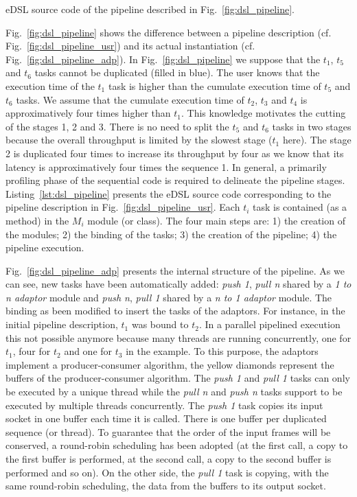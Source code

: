 \begin{listing}[htp]
  \inputminted[frame=lines,linenos]{C++}{main/chapter6/src/pipeline/pipeline.cpp}
  \caption{\AFFECT \Cxx eDSL source code of the pipeline described in
    Fig.~\ref{fig:dsl_pipeline}.}
  \label{lst:dsl_pipeline}
\end{listing}

Fig.~\ref{fig:dsl_pipeline} shows the difference between a pipeline description
(cf. Fig.~\ref{fig:dsl_pipeline_usr}) and its actual instantiation (cf.
Fig.~\ref{fig:dsl_pipeline_adp}). In Fig.~\ref{fig:dsl_pipeline} we suppose
that the $t_1$, $t_5$ and $t_6$ tasks cannot be duplicated (filled in blue). The
user knows that the execution time of the $t_1$ task is higher than the cumulate
execution time of $t_5$ and $t_6$ tasks. We assume that the cumulate execution
time of $t_2$, $t_3$ and $t_4$ is approximatively four times higher than $t_1$.
This knowledge motivates the cutting of the stages 1, 2 and 3. There is no need
to split the $t_5$ and $t_6$ tasks in two stages because the overall throughput
is limited by the slowest stage ($t_1$ here). The stage 2 is duplicated four
times to increase its throughput by four as we know that its latency is
approximatively four times the sequence 1. In general, a primarily profiling
phase of the sequential code is required to delineate the pipeline stages.
Listing~\ref{lst:dsl_pipeline} presents the \Cxx eDSL source code corresponding
to the pipeline description in Fig.~\ref{fig:dsl_pipeline_usr}. Each $t_i$ task
is contained (as a method) in the $M_i$ module (or class). The four main steps
are: 1) the creation of the modules; 2) the binding of the tasks; 3) the
creation of the pipeline; 4) the pipeline execution.

Fig.~\ref{fig:dsl_pipeline_adp} presents the internal structure of the pipeline.
As we can see, new tasks have been automatically added: \emph{push 1},
\emph{pull n} shared by a \emph{1 to n adaptor} module and \emph{push n},
\emph{pull 1} shared by a \emph{n to 1 adaptor} module. The binding as been
modified to insert the tasks of the adaptors. For instance, in the initial
pipeline description, $t_1$ was bound to $t_2$. In a parallel pipelined
execution this not possible anymore because many threads are running
concurrently, one for $t_1$, four for $t_2$ and one for $t_3$ in the example. To
this purpose, the adaptors implement a producer-consumer algorithm, the yellow
diamonds represent the buffers of the producer-consumer algorithm. The
\emph{push 1} and \emph{pull 1} tasks can only be executed by a unique thread
while the \emph{pull n} and \emph{push n} tasks support to be executed by
multiple threads concurrently. The \emph{push 1} task copies its input socket in
one buffer each time it is called. There is one buffer per duplicated sequence
(or thread). To guarantee that the order of the input frames will be conserved,
a round-robin scheduling has been adopted (at the first call, a copy to the
first buffer is performed, at the second call, a copy to the second buffer is
performed and so on). On the other side, the \emph{pull 1} task is copying, with
the same round-robin scheduling, the data from the buffers to its output socket.

